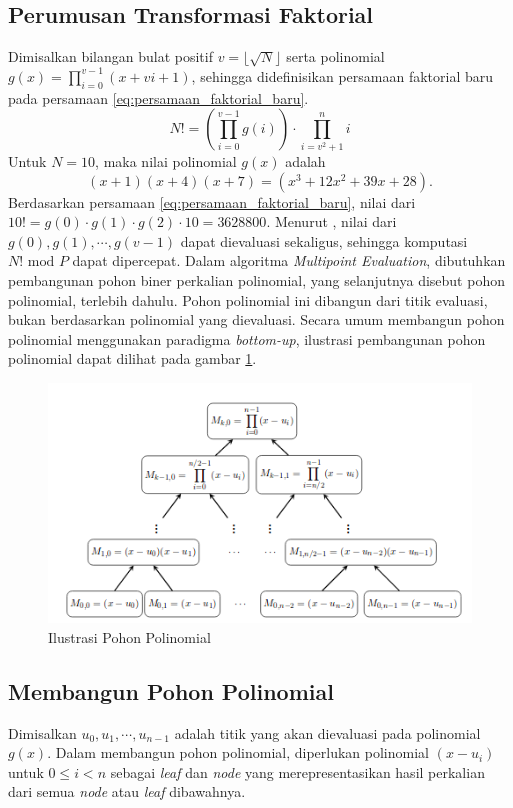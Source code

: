 \subsection{Perumusan Transformasi Faktorial}
\label{sec:perumusan_transformasi_faktorial}
Dimisalkan bilangan bulat positif $ v = \lfloor \sqrt{N} \rfloor $ serta polinomial $ g(x) = \prod_{i=0}^{v-1} (x + vi + 1) $, sehingga didefinisikan persamaan faktorial baru pada persamaan \eqref{eq:persamaan_faktorial_baru}.
\begin{equation}
	N ! = \left( \prod_{i=0}^{v-1} g(i) \right) \cdot \prod_{i=v^2+1}^n i
	\label{eq:persamaan_faktorial_baru}
\end{equation}
Untuk $ N = 10 $, maka nilai polinomial $g(x)$ adalah $$ (x+1)(x+4)(x+7) = (x^3 + 12x^2 + 39x + 28). $$ Berdasarkan persamaan \eqref{eq:persamaan_faktorial_baru}, nilai dari $ 10! = g(0) \cdot g(1) \cdot g(2) \cdot 10 = 3628800 $. 
Menurut \cite{multipoint_evaluation}, nilai dari $ g(0), g(1), \cdots , g(v-1) $ dapat dievaluasi sekaligus, sehingga komputasi $ N! \text{ mod } P $ dapat dipercepat.
\newpage
Dalam algoritma \textit{Multipoint Evaluation}, dibutuhkan pembangunan pohon biner perkalian polinomial, yang selanjutnya disebut pohon polinomial, terlebih dahulu. Pohon polinomial ini dibangun dari titik evaluasi, bukan berdasarkan polinomial yang dievaluasi. Secara umum membangun pohon polinomial menggunakan paradigma \textit{bottom-up}, ilustrasi pembangunan pohon polinomial dapat dilihat pada gambar \ref{fig:ilustrasi-pohon-polinomial}.

\begin{figure}
	\Centering
	\includegraphics [scale=0.6]{bab2/img/ilustrasi-pohon-polinomial}
	\caption {Ilustrasi Pohon Polinomial}
	\label {fig:ilustrasi-pohon-polinomial}
\end{figure}

\subsection{Membangun Pohon Polinomial}
\label{sec:membangun_pohon_polinomial}
Dimisalkan $ u_0, u_1, \cdots , u_{n-1} $ adalah titik yang akan dievaluasi pada polinomial $ g(x) $. Dalam membangun pohon polinomial, diperlukan polinomial $( x - u_i) $ untuk $ 0 \leq i < n $ sebagai \textit{leaf} dan \textit{node} yang merepresentasikan hasil perkalian dari semua \textit{node} atau \textit{leaf} dibawahnya. 


